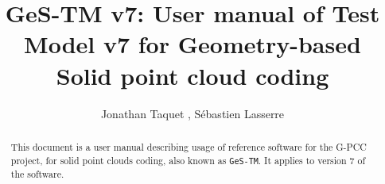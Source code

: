 \documentclass[a4paper,11pt]{mpegdoc}
\title{GeS-TM v7: User manual of Test Model v7 for Geometry-based Solid
        point cloud coding}
\author{%
  Jonathan Taquet
  \email{jonathant@xiaomi.com},
  Sébastien Lasserre
	\email{slasserre@ofinno.com}
}
\begin{document}
\maketitle
\begin{abstract}
This document is a user manual describing usage of reference software
for the G-PCC project, for solid point clouds coding, also known as
\texttt{GeS-TM}. It applies to version 7 of the software.
\end{abstract}

\tableofcontents

\pagebreak









%
\end{document}
